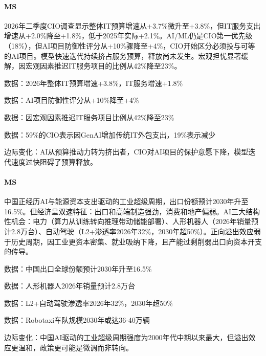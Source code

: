 \documentclass[11pt]{ctexart}
\begin{document}
\paragraph{MS} 2026年二季度CIO调查显示整体IT预算增速从+3.7\%微升至+3.8\%，但IT服务支出增速从+2.0\%降至+1.8\%，低于2025年实际+2.1\%。AI/ML仍是CIO第一优先级（18\%），但AI项目防御性评分从+10\%骤降至+4\%，CIO开始区分必须投与可等的AI项目。模型快速迭代持续挤占服务预算，释放尚未发生。宏观担忧显著缓解，因宏观因素推迟IT服务项目的比例从42\%降至23\%。
{\small\color{refgray}数据：2026年整体IT预算增速+3.8\%，IT服务增速+1.8\%\par}
{\small\color{refgray}数据：AI项目防御性评分从+10\%降至+4\%\par}
{\small\color{refgray}数据：因宏观因素推迟IT服务项目比例从42\%降至23\%\par}
{\small\color{refgray}数据：59\%的CIO表示因GenAI增加传统IT外包支出，19\%表示减少\par}
{\small\color{refgray}边际变化：AI从预算推动力转为挤出者，CIO对AI项目的保护意愿下降，模型迭代速度过快阻碍了预算释放。\par}
\paragraph{MS} 中国正经历AI与能源资本支出驱动的工业超级周期，出口份额预计2030年升至16.5\%。但经济呈双速特征：出口和高端制造强劲，消费和地产偏弱。AI三大结构性机会：电力（算力从训练转向推理带动储能部署）、人形机器人（2026年销量预计2.8万台）、自动驾驶（L2+渗透率2026年32\%，2030年超50\%）。正向溢出效应弱于历史周期，因工业更资本密集、就业吸纳下降，且产能过剩削弱出口向资本开支的传导。
{\small\color{refgray}数据：中国出口全球份额预计2030年升至16.5\%\par}
{\small\color{refgray}数据：人形机器人2026年销量预计2.8万台\par}
{\small\color{refgray}数据：L2+自动驾驶渗透率2026年32\%，2030年超50\%\par}
{\small\color{refgray}数据：Robotaxi车队规模2030年或达36-40万辆\par}
{\small\color{refgray}边际变化：中国AI驱动的工业超级周期强度为2000年代中期以来最大，但溢出效应更温和，政策更可能是微调而非转向。\par}
\end{document}
